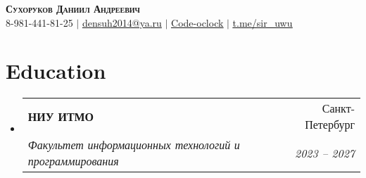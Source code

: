 \documentclass[letterpaper,11pt]{article}
\makeatletter
\newcommand{\resumeSubheading}[4]{
  \vspace{-2pt}\item
    \begin{tabular*}{0.97\textwidth}[t]{l@{\extracolsep{\fill}}r}
      \textbf{#1} & #2 \\
      \textit{\small#3} & \textit{\small #4} \\
    \end{tabular*}\vspace{-7pt}
}
\newcommand{\resumeSubHeadingListStart}{\begin{itemize}[leftmargin=0.15in, label={}]}
\newcommand{\resumeSubHeadingListEnd}{\end{itemize}}
\makeatother
\begin{document}

\begin{center}
    \textbf{\Huge \scshape Сухоруков Даниил Андреевич} \\ \vspace{1pt}
    \small 8-981-441-81-25 $|$ \underline{densuh2014@ya.ru} $|$ 
    \href{https://github.com/Code-oclock?tab=repositories}{\underline{Code-oclock}} $|$
    \href{https://t.me/sir_uwu}{\underline{t.me/sir\_uwu}}
\end{center}


\section{Education}
  \resumeSubHeadingListStart
    \resumeSubheading
      {НИУ ИТМО}{Санкт-Петербург}
      {Факультет информационных технологий и программирования}{2023 -- 2027}
  \resumeSubHeadingListEnd

\end{document}
